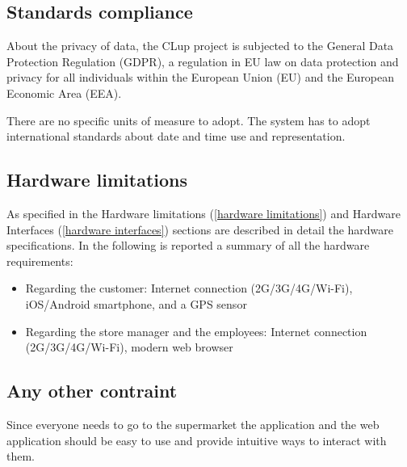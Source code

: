 \subsection{Standards compliance}
About the privacy of data, the CLup project is subjected to the General Data Protection Regulation (GDPR), a regulation in EU law on data protection and privacy for all individuals within the European Union (EU) and the European Economic Area (EEA).

There are no specific units of measure to adopt. The system has to adopt international standards about date and time use and representation.

\subsection{Hardware limitations}
As specified in the Hardware limitations (\ref{hardware limitations}) and Hardware Interfaces (\ref{hardware interfaces}) sections are described in detail the hardware specifications. In the following is reported a summary of all the hardware requirements:
\begin{itemize}
    \item Regarding the customer: Internet connection (2G/3G/4G/Wi-Fi), iOS/Android smartphone, and a GPS sensor
    \item Regarding the store manager and the employees: Internet connection (2G/3G/4G/Wi-Fi), modern web browser
\end{itemize}

\subsection{Any other contraint}
Since everyone needs to go to the supermarket the application and the web application should be easy to use and provide intuitive ways to interact with them.